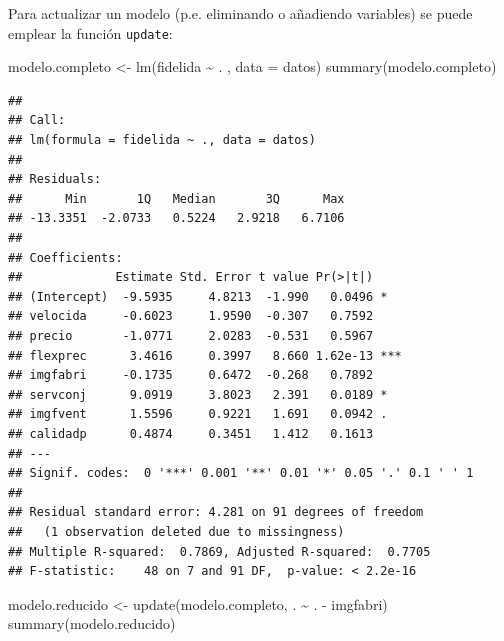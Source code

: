 \documentclass[
]{book}
\newenvironment{Shaded}{\begin{snugshade}}{\end{snugshade}}
\newcommand{\AttributeTok}[1]{\textcolor[rgb]{0.77,0.63,0.00}{#1}}
\newcommand{\FunctionTok}[1]{\textcolor[rgb]{0.00,0.00,0.00}{#1}}
\newcommand{\NormalTok}[1]{#1}
\newcommand{\OtherTok}[1]{\textcolor[rgb]{0.56,0.35,0.01}{#1}}
\newcommand{\SpecialCharTok}[1]{\textcolor[rgb]{0.00,0.00,0.00}{#1}}
\theoremstyle{break}
\begin{document}
Para actualizar un modelo (p.e. eliminando o añadiendo variables) se puede emplear la función \texttt{update}:

\begin{Shaded}
\begin{Highlighting}[]
\NormalTok{modelo.completo }\OtherTok{\textless{}{-}} \FunctionTok{lm}\NormalTok{(fidelida }\SpecialCharTok{\textasciitilde{}}\NormalTok{ . , }\AttributeTok{data =}\NormalTok{ datos)}
\FunctionTok{summary}\NormalTok{(modelo.completo)}
\end{Highlighting}
\end{Shaded}

\begin{verbatim}
## 
## Call:
## lm(formula = fidelida ~ ., data = datos)
## 
## Residuals:
##      Min       1Q   Median       3Q      Max 
## -13.3351  -2.0733   0.5224   2.9218   6.7106 
## 
## Coefficients:
##             Estimate Std. Error t value Pr(>|t|)    
## (Intercept)  -9.5935     4.8213  -1.990   0.0496 *  
## velocida     -0.6023     1.9590  -0.307   0.7592    
## precio       -1.0771     2.0283  -0.531   0.5967    
## flexprec      3.4616     0.3997   8.660 1.62e-13 ***
## imgfabri     -0.1735     0.6472  -0.268   0.7892    
## servconj      9.0919     3.8023   2.391   0.0189 *  
## imgfvent      1.5596     0.9221   1.691   0.0942 .  
## calidadp      0.4874     0.3451   1.412   0.1613    
## ---
## Signif. codes:  0 '***' 0.001 '**' 0.01 '*' 0.05 '.' 0.1 ' ' 1
## 
## Residual standard error: 4.281 on 91 degrees of freedom
##   (1 observation deleted due to missingness)
## Multiple R-squared:  0.7869, Adjusted R-squared:  0.7705 
## F-statistic:    48 on 7 and 91 DF,  p-value: < 2.2e-16
\end{verbatim}

\begin{Shaded}
\begin{Highlighting}[]
\NormalTok{modelo.reducido }\OtherTok{\textless{}{-}} \FunctionTok{update}\NormalTok{(modelo.completo, . }\SpecialCharTok{\textasciitilde{}}\NormalTok{ . }\SpecialCharTok{{-}}\NormalTok{ imgfabri)}
\FunctionTok{summary}\NormalTok{(modelo.reducido)}
\end{Highlighting}
\end{Shaded}
\end{document}
